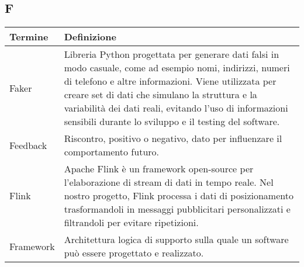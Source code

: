 \documentclass[10pt]{article}
\begin{document}
\subsection{F} %
\begin{longtable}{|>{\centering\arraybackslash}m{2.5cm}|>{\arraybackslash}m{12.5cm}|}
\hline
\rowcolor[gray]{0.8}
\textbf{Termine} & \textbf{Definizione}\\
\endhead
\hline
Faker & Libreria Python progettata per generare dati falsi in modo casuale, come ad esempio nomi, indirizzi, numeri di telefono e altre informazioni. Viene utilizzata per creare set di dati che simulano la struttura e la variabilità dei dati reali, evitando l'uso di informazioni sensibili durante lo sviluppo e il testing del software.\\
\hline
Feedback & Riscontro, positivo o negativo, dato per influenzare il comportamento futuro.\\
\hline
Flink & Apache Flink è un framework open-source per l'elaborazione di stream di dati in tempo reale. Nel nostro progetto, Flink processa i dati di posizionamento trasformandoli in messaggi pubblicitari personalizzati e filtrandoli per evitare ripetizioni.\\
\hline
Framework & Architettura logica di supporto sulla quale un software può essere progettato e realizzato.\\
\hline
\end{longtable}
\end{document}
